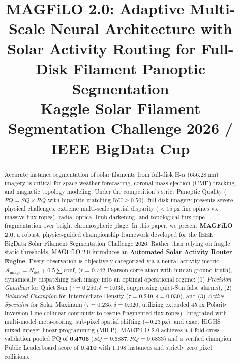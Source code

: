 \documentclass[conference]{IEEEtran}
\begin{document}
\title{MAGFiLO 2.0: Adaptive Multi-Scale Neural Architecture with Solar Activity Routing for Full-Disk Filament Panoptic Segmentation\\
\large Kaggle Solar Filament Segmentation Challenge 2026 / IEEE BigData Cup
}

\author{
}

\maketitle

\begin{abstract}
Accurate instance segmentation of solar filaments from full-disk H-$\alpha$ ($656.28$\,nm) imagery is critical for space weather forecasting, coronal mass ejection (CME) tracking, and magnetic topology modeling. Under the competition's strict Panoptic Quality ($PQ = SQ \times RQ$ with bipartite matching $\text{IoU} \ge 0.50$), full-disk imagery presents severe physical challenges: extreme multi-scale spatial disparity ($<15$\,px fine spines vs. massive flux ropes), radial optical limb darkening, and topological flux rope fragmentation over bright chromospheric plage. In this paper, we present \textbf{MAGFiLO 2.0}, a robust, physics-guided championship framework developed for the IEEE BigData Solar Filament Segmentation Challenge 2026. Rather than relying on fragile static thresholds, MAGFiLO 2.0 introduces an \textbf{Automated Solar Activity Router Engine}. Every observation is objectively categorized via a neural activity metric $\mathcal{A}_{\text{image}} = N_{\text{det}} + 0.5 \sum \text{conf}_i$ ($r = 0.742$ Pearson correlation with human ground truth), dynamically dispatching each image into an optimal operational regime: (1) \textit{Precision Guardian} for Quiet Sun ($\tau = 0.250, \delta = 0.035$, suppressing quiet-Sun false alarms), (2) \textit{Balanced Champion} for Intermediate Density ($\tau = 0.240, \delta = 0.030$), and (3) \textit{Active Specialist} for Solar Maximum ($\tau = 0.235, \delta = 0.020$, utilizing extended 45\,px Polarity Inversion Line collinear continuity to rescue fragmented flux ropes). Integrated with multi-model meta-scoring, sub-pixel spatial shifting ($-0.23$\,px), and exact HiGHS mixed-integer linear programming (MILP), MAGFiLO 2.0 achieves a 4-fold cross-validation pooled PQ of \textbf{0.4706} ($SQ = 0.6887, RQ = 0.6833$) and a verified champion Public Leaderboard score of \textbf{0.410} with 1,198 instances and strictly zero pixel collisions.
\end{abstract}
\end{document}

